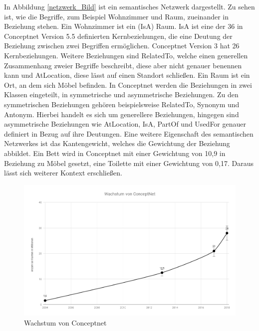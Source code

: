 In Abbildung \ref{netzwerk_Bild} ist ein semantisches Netzwerk dargestellt. Zu sehen ist, wie die Begriffe, zum Beispiel Wohnzimmer und Raum, zueinander in Beziehung stehen. Ein Wohnzimmer ist ein (IsA) Raum. IsA ist eine der 36 in Conceptnet Version 5.5 definierten Kernbeziehungen, die eine Deutung der Beziehung zwischen zwei Begriffen ermöglichen. Conceptnet Version 3 hat 26 Kernbeziehungen\cite{havasi2007conceptnet}. Weitere Beziehungen sind RelatedTo, welche einen generellen Zusammenhang zweier Begriffe beschreibt, diese aber nicht genauer benennen kann und AtLocation, diese lässt auf einen Standort schließen. Ein Raum ist ein Ort, an dem sich Möbel befinden. 
In Conceptnet werden die Beziehungen in zwei Klassen eingeteilt, in symmetrische und asymmetrische Beziehungen. Zu den symmetrischen Beziehungen gehören beispielsweise RelatedTo, Synonym und Antonym. Hierbei handelt es sich um generellere Beziehungen, hingegen sind asymmetrische Beziehungen wie AtLocation, IsA, PartOf und UsedFor genauer definiert in Bezug auf ihre Deutungen. Eine weitere Eigenschaft des semantischen Netzwerkes ist das Kantengewicht, welches die Gewichtung der Beziehung abbildet. Ein Bett wird in Conceptnet mit einer Gewichtung von 10,9 in Beziehung zu Möbel gesetzt, eine Toilette mit einer Gewichtung von 0,17. Daraus lässt sich weiterer Kontext erschließen. 

\begin{figure}[h]
	
	\begin{center}
		
		\includegraphics[width=16cm]{images/Wachstum_von_ConceptNet.png}
		
		\caption{Wachstum von Conceptnet}
		
		\label{wachstum_cn}
		
	\end{center}
	
	
\end{figure}


